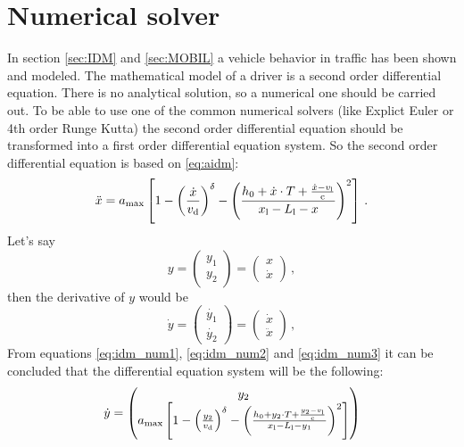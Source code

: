 \documentclass[a4paper,12pt,twoside]{report} %
\begin{document}
		\section{Numerical solver}
			In section \ref{sec:IDM} and \ref{sec:MOBIL} a vehicle behavior in traffic has been shown and modeled. The mathematical model of a driver is a second order differential equation. There is no analytical solution, so a numerical one should be carried out. To be able to use one of the common numerical solvers (like Explict Euler or 4th order Runge Kutta) the second order differential equation should be transformed into a first order differential equation system. So the second order differential equation is based on \ref{eq:aidm}:
			\begin{equation}
				\ddot{x}=a_{\rm max}\left [ 1 - \left ( \frac{\dot{x}}{v_{\rm d}} \right )^\delta - \left ( \frac{h_0 + \dot{x}\cdot T + \frac{\dot{x}-v_{\rm l}}{{\rm c}}}{x_{\rm l}-L_{\rm l} - x} \right )^2 \right ]\,.
				\label{eq:idm_num1}
			\end{equation}
			Let's say
			\begin{equation}
				y=
				\begin{pmatrix}
					y_1\\
					y_2
				\end{pmatrix}
				=
				\begin{pmatrix}
					x\\
					\dot{x}
				\end{pmatrix}\,,
				\label{eq:idm_num2}
			\end{equation}
			then the derivative of $y$ would be
			\begin{equation}
				\dot{y}=
				\begin{pmatrix}
					\dot{y_1}\\
					\dot{y_2}
				\end{pmatrix}
				=
				\begin{pmatrix}
					\dot{x}\\
					\ddot{x}
				\end{pmatrix}\,,
				\label{eq:idm_num3}
			\end{equation}
			From equations \ref{eq:idm_num1}, \ref{eq:idm_num2} and \ref{eq:idm_num3} it can be concluded that the differential equation system will be the following:
			\begin{equation}
				\dot{y}=
				\begin{pmatrix}
					y_2\\
					a_{\rm max}\left [ 1 - \left ( \frac{y_2}{v_{\rm d}} \right )^{\rm \delta} - \left ( \frac{h_0 + y_2\cdot T + \frac{y_2-v_{\rm l}}{{\rm c}}}{x_{\rm l}-L_{\rm l} - y_1} \right )^2 \right ]
				\end{pmatrix}
				\label{eq:numerical_idm}
			\end{equation}
\end{document}
